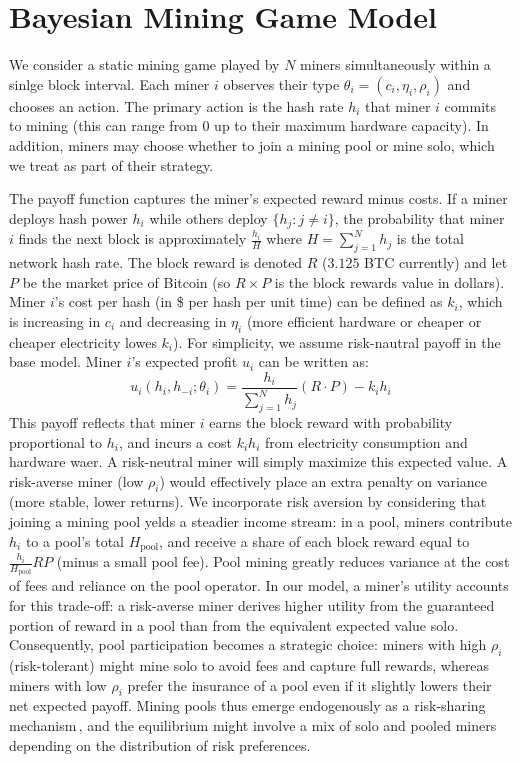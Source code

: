 \documentclass[12pt]{article}
\begin{document}
\section{Bayesian Mining Game Model}
We consider a static mining game played by $N$ miners simultaneously within a sinlge block interval. Each miner $i$ observes their type $\theta_i=(c_i,\eta_i,\rho_i)$ and chooses an action. The primary action is the hash rate $h_i$ that miner $i$ commits to mining (this can range from 0 up to their maximum hardware capacity). In addition, miners may choose whether to join a mining pool or mine solo, which we treat as part of their strategy.

The payoff function captures the miner's expected reward minus costs. If a miner deploys hash power $h_i$ while others deploy $\{h_j : j\neq i\}$, the probability that miner $i$ finds the next block is approximately $\frac{h_i}{H}$ where $H=\sum_{j=1}^N h_j$ is the total network hash rate. The block reward is denoted $R$ ($3.125$ BTC currently) and let $P$ be the market price of Bitcoin (so $R \times P$ is the block rewards value in dollars). Miner $i$'s cost per hash (in \$ per hash per unit time) can be defined as $k_i$, which is increasing in $c_i$ and decreasing in $\eta_i$ (more efficient hardware or cheaper or cheaper electricity lowes $k_i$). For simplicity, we assume risk-nautral payoff in the base model. Miner $i$'s expected profit $u_i$ can be written as:
\begin{equation}
	u_i(h_i, h_{-i};\theta_i) = \frac{h_i}{\sum_{j=1}^{N}h_j}(R\cdot P) - k_i h_i
\end{equation}
This payoff reflects that miner $i$ earns the block reward with probability proportional to $h_i$, and incurs a cost $k_i h_i$ from electricity consumption and hardware waer. A risk-neutral miner will simply maximize this expected value. A risk-averse miner (low $\rho_i$) would effectively place an extra penalty on variance (more stable, lower returns). We incorporate risk aversion by considering that joining a mining pool yelds a steadier income stream: in a pool, miners contribute $h_i$ to a pool's total $H_{\text{pool}}$, and receive a share of each block reward equal to $\frac{h_i}{H_{\text{pool}}}RP$ (minus a small pool fee). Pool mining greatly reduces variance at the cost of fees and reliance on the pool operator. In our model, a miner's utility accounts for this trade-off: a risk-averse miner derives higher utility from the guaranteed portion of reward in a pool than from the equivalent expected value solo. Consequently, pool participation becomes a strategic choice: miners with high $\rho_i$ (risk-tolerant) might mine solo to avoid fees and capture full rewards, whereas miners with low $\rho_i$ prefer the insurance of a pool even if it slightly lowers their net expected payoff. Mining pools thus emerge endogenously as a risk-sharing mechanism\,\cite{albrecher2022blockchain}, and the equilibrium might involve a mix of solo and pooled miners depending on the distribution of risk preferences.
\end{document}

